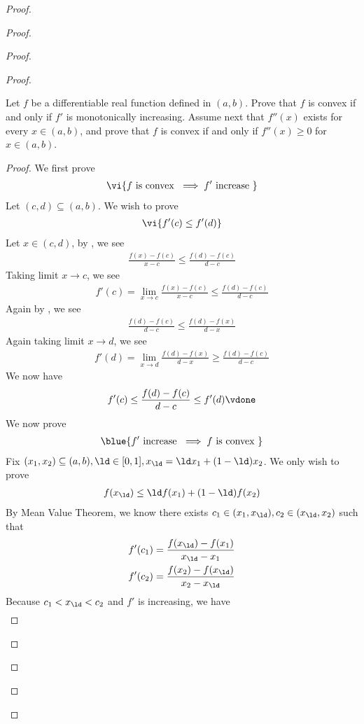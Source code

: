 \documentclass{report}
\begin{document}
\begin{proof}
\begin{proof}
\begin{proof}
\begin{proof}
\begin{question}{}{}
Let \( f \) be a differentiable real function defined in \( (a,b) \). Prove that \( f \) is convex if and only if \( f' \) is monotonically increasing. Assume next that \( f''(x) \) exists for every \( x \in (a,b) \), and prove that \( f \) is convex if and only if \( f''(x) \geq 0 \) for \( x \in (a,b) \).
\end{question}
\begin{proof}
We first prove 
\begin{align*}
\vi{f \text{ is convex }\implies f'\text{ increase }}
\end{align*}
Let $(c,d)\subseteq (a,b)$. We wish to prove 
\begin{align*}
\vi{f'(c)\leq f'(d)}
\end{align*}
Let $x\in (c,d)$, by , we see 
\begin{align*}
\frac{f(x)-f(c)}{x-c}\leq \frac{f(d)-f(c)}{d-c}
\end{align*}
Taking limit $x \to c$, we see 
\begin{align*}
f'(c)=\lim_{x\to c}\frac{f(x)-f(c)}{x-c}\leq \frac{f(d)-f(c)}{d-c}
\end{align*}
Again by , we see 
\begin{align*}
\frac{f(d)-f(c)}{d-c}\leq \frac{f(d)-f(x)}{d-x}
\end{align*}
Again taking limit $x \to d$, we see 
\begin{align*}
f'(d)=\lim_{x\to d}\frac{f(d)-f(x)}{d-x}\geq \frac{f(d)-f(c)}{d-c}
\end{align*}
We now have 
\begin{align*}
f'(c)\leq \frac{f(d)-f(c)}{d-c}\leq f'(d)\vdone
\end{align*}
We now prove 
\begin{align*}
\blue{f' \text{ increase }\implies f\text{ is convex }}
\end{align*}
Fix $(x_1,x_2)\subseteq (a,b),\ld \in [0,1],x_\ld =\ld x_1+(1-\ld )x_2$. We only wish to prove 
\begin{align*}
f(x_{\ld })\leq \ld f(x_1)+(1-\ld )f(x_2)
\end{align*}
By Mean Value Theorem, we know there exists $c_1\in (x_1,x_\ld ),c_2\in (x_\ld ,x_2)$ such that 
\begin{align*}
f'(c_1)&=\frac{f(x_\ld )-f(x_1)}{x_\ld -x_1}\\
f'(c_2)&=\frac{f(x_2)-f(x_\ld )}{x_2-x_\ld }
\end{align*}
Because $c_1<x_\ld <c_2$ and $f'$ is increasing, we have 
 \begin{align*}

\end{align*}
\end{proof}
\end{proof}
\end{proof}
\end{proof}
\end{proof}
\end{document}

